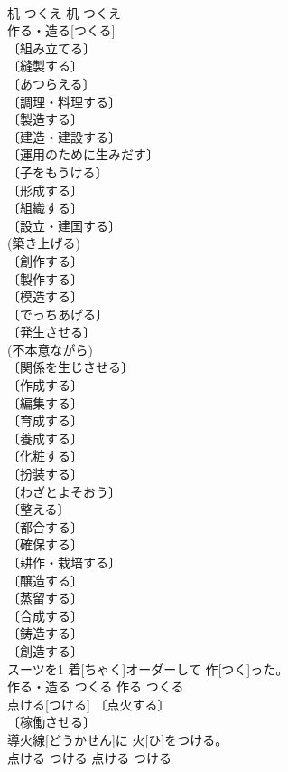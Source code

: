 \documentclass[8pt]{extreport}
\begin{document}
\begin{CJK}{UTF8}{min}
\\	机	つくえ	机	つくえ	
\\	作る・造る[つくる]	
\\	〔組み立てる〕 
\\	〔縫製する〕 
\\	〔あつらえる〕 
\\	〔調理・料理する〕 
\\	〔製造する〕 
\\	〔建造・建設する〕 
\\	〔運用のために生みだす〕 
\\	〔子をもうける〕 
\\	〔形成する〕 
\\	〔組織する〕 
\\	〔設立・建国する〕 
\\	(築き上げる) 
\\	〔創作する〕 
\\	〔製作する〕 
\\	〔模造する〕 
\\	〔でっちあげる〕 
\\	〔発生させる〕 
\\	(不本意ながら) 
\\	〔関係を生じさせる〕 
\\	〔作成する〕 
\\	〔編集する〕 
\\	〔育成する〕 
\\	〔養成する〕 
\\	〔化粧する〕 
\\	〔扮装する〕 
\\	〔わざとよそおう〕 
\\	〔整える〕 
\\	〔都合する〕 
\\	〔確保する〕 
\\	〔耕作・栽培する〕 
\\	〔醸造する〕 
\\	〔蒸留する〕 
\\	〔合成する〕 
\\	〔鋳造する〕 
\\	〔創造する〕 
\\	スーツを1 着[ちゃく]オーダーして 作[つく]った。	
\\	作る・造る	つくる	作る	つくる	
\\	点ける[つける]	〔点火する〕 
\\	〔稼働させる〕 
\\	導火線[どうかせん]に 火[ひ]をつける。	
\\	点ける	つける	点ける	つける	

\end{CJK}
\end{document}
